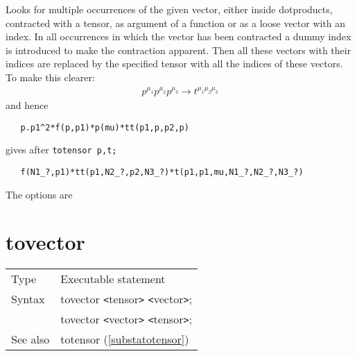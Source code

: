 \noindent Looks for multiple occurrences of the given 
vector, either inside dotproducts, contracted with a tensor, as argument of 
a function or as a loose vector with an index. In all occurrences in 
which the vector has been contracted a dummy index is introduced to make 
the contraction apparent. Then all these vectors with their indices are 
replaced by the specified tensor with all the indices of these vectors. To 
make this clearer:
\begin{eqnarray}
    p^{\mu_1}p^{\mu_2}p^{\mu_3} \rightarrow t^{\mu_1\mu_2\mu_3} \nonumber
\end{eqnarray}
\setcounter{equation}{6}
and hence
\begin{verbatim}
   p.p1^2*f(p,p1)*p(mu)*tt(p1,p,p2,p)
\end{verbatim}
gives after \verb:totensor p,t;:
\begin{verbatim}
   f(N1_?,p1)*tt(p1,N2_?,p2,N3_?)*t(p1,p1,mu,N1_?,N2_?,N3_?)
\end{verbatim}\vspace{4mm}

\noindent The options are




\vspace{10mm}


\section{tovector}
\label{substatovector}

\noindent \begin{tabular}{ll}
Type & Executable statement\\
Syntax & tovector {\tt<}tensor{\tt>} {\tt<}vector{\tt>}; \\
       & tovector {\tt<}vector{\tt>} {\tt<}tensor{\tt>};
\\ See also & totensor (\ref{substatotensor})
\end{tabular} \vspace{4mm}

